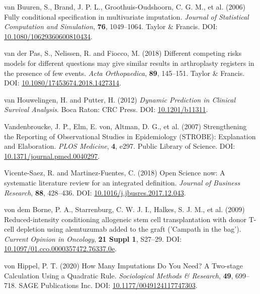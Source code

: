 \documentclass[
  letterpaper,
  DIV=11,
  numbers=noendperiod]{scrreprt}
\newlength{\cslhangindent}
\newenvironment{CSLReferences}[2] %
 {\begin{list}{}{%
  \setlength{\itemindent}{0pt}
  \setlength{\leftmargin}{0pt}
  \setlength{\parsep}{0pt}
  \ifodd #1
   \setlength{\leftmargin}{\cslhangindent}
   \setlength{\itemindent}{-1\cslhangindent}
  \fi
  \setlength{\itemsep}{#2\baselineskip}}}
 {\end{list}}
\begin{document}
\begin{CSLReferences}{1}{1}
van Buuren, S., Brand, J. P. L., Groothuis-Oudshoorn, C. G. M., et al.
(2006) Fully conditional specification in multivariate imputation.
\emph{Journal of Statistical Computation and Simulation}, \textbf{76},
1049--1064. Taylor \& Francis. DOI:
\href{https://doi.org/10.1080/10629360600810434}{10.1080/10629360600810434}.

van der Pas, S., Nelissen, R. and Fiocco, M. (2018) Different competing
risks models for different questions may give similar results in
arthroplasty registers in the presence of few events. \emph{Acta
Orthopaedica}, \textbf{89}, 145--151. Taylor \& Francis. DOI:
\href{https://doi.org/10.1080/17453674.2018.1427314}{10.1080/17453674.2018.1427314}.

van Houwelingen, H. and Putter, H. (2012) \emph{Dynamic {Prediction} in
{Clinical Survival Analysis}}. Boca Raton: CRC Press. DOI:
\href{https://doi.org/10.1201/b11311}{10.1201/b11311}.

Vandenbroucke, J. P., Elm, E. von, Altman, D. G., et al. (2007)
Strengthening the {Reporting} of {Observational Studies} in
{Epidemiology} ({STROBE}): {Explanation} and {Elaboration}. \emph{PLOS
Medicine}, \textbf{4}, e297. Public Library of Science. DOI:
\href{https://doi.org/10.1371/journal.pmed.0040297}{10.1371/journal.pmed.0040297}.

Vicente-Saez, R. and Martinez-Fuentes, C. (2018) Open {Science} now: {A}
systematic literature review for an integrated definition. \emph{Journal
of Business Research}, \textbf{88}, 428--436. DOI:
\href{https://doi.org/10.1016/j.jbusres.2017.12.043}{10.1016/j.jbusres.2017.12.043}.

von dem Borne, P. A., Starrenburg, C. W. J. I., Halkes, S. J. M., et al.
(2009) Reduced-intensity conditioning allogeneic stem cell
transplantation with donor {T-cell} depletion using alemtuzumab added to
the graft ('{Campath} in the bag'). \emph{Current Opinion in Oncology},
\textbf{21 Suppl 1}, S27--29. DOI:
\href{https://doi.org/10.1097/01.cco.0000357472.76337.0e}{10.1097/01.cco.0000357472.76337.0e}.

von Hippel, P. T. (2020) How {Many Imputations Do You Need}? {A
Two-stage Calculation Using} a {Quadratic Rule}. \emph{Sociological
Methods \& Research}, \textbf{49}, 699--718. SAGE Publications Inc. DOI:
\href{https://doi.org/10.1177/0049124117747303}{10.1177/0049124117747303}.


\end{CSLReferences}
\end{document}
